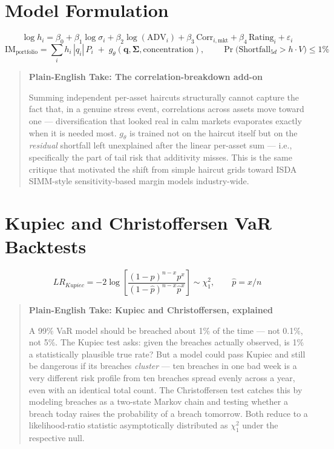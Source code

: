 \documentclass[11pt]{report}
\newenvironment{feynman}[1]{%
  \begin{quote}\small\color{black}
  \colorbox{feynman}{\parbox{0.97\linewidth}{\vspace{2pt}\textbf{\color{navy}Plain-English Take: #1}\\[2pt]
}}
}{\end{quote}}
\begin{document}
\section{Model Formulation}
\begin{equation}
\log h_i = \beta_0 + \beta_1 \log \sigma_i + \beta_2 \log(\text{ADV}_i) + \beta_3\, \text{Corr}_{i,\text{mkt}} + \beta_4\, \text{Rating}_i + \varepsilon_i
\end{equation}
\begin{equation}
\text{IM}_{\text{portfolio}} = \sum_i h_i\,|q_i|\,P_i \;+\; g_\theta(\mathbf{q}, \boldsymbol\Sigma, \text{concentration}), \qquad
\Pr\big(\text{Shortfall}_{5d} > h \cdot V\big) \le 1\%
\end{equation}
\begin{feynman}{The correlation-breakdown add-on}
Summing independent per-asset haircuts structurally cannot capture the fact that, in a genuine stress
event, correlations across assets move toward one — diversification that looked real in calm markets
evaporates exactly when it is needed most. $g_\theta$ is trained not on the haircut itself but on the
\emph{residual} shortfall left unexplained after the linear per-asset sum — i.e., specifically the part
of tail risk that additivity misses. This is the same critique that motivated the shift from simple
haircut grids toward ISDA SIMM-style sensitivity-based margin models industry-wide.
\end{feynman}

\section{Kupiec and Christoffersen VaR Backtests}
\begin{equation}
LR_{Kupiec} = -2\log\!\left[\frac{(1-p)^{n-x}p^x}{(1-\hat p)^{n-x}\hat p^x}\right] \sim \chi^2_1, \qquad \hat p = x/n
\end{equation}
\begin{feynman}{Kupiec and Christoffersen, explained}
A 99\% VaR model should be breached about 1\% of the time — not 0.1\%, not 5\%. The Kupiec test asks:
given the breaches actually observed, is 1\% a statistically plausible true rate? But a model could
pass Kupiec and still be dangerous if its breaches \emph{cluster} — ten breaches in one bad week is a
very different risk profile from ten breaches spread evenly across a year, even with an identical total
count. The Christoffersen test catches this by modeling breaches as a two-state Markov chain and testing
whether a breach today raises the probability of a breach tomorrow. Both reduce to a likelihood-ratio
statistic asymptotically distributed as $\chi^2_1$ under the respective null.
\end{feynman}
\end{document}
